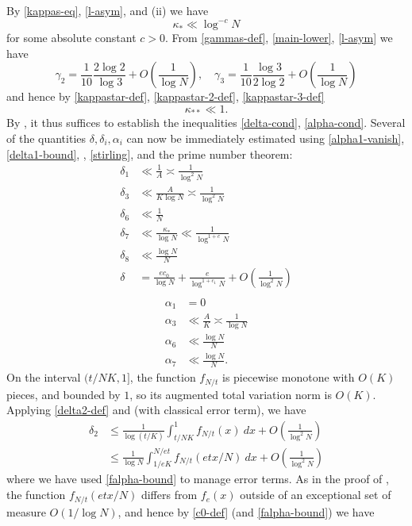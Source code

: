 \documentclass[12pt,a4paper,reqno]{amsart}
\numberwithin{equation}{section}
\theoremstyle{plain}
\theoremstyle{definition}
\begin{document}
By \eqref{kappas-eq}, \eqref{l-asym}, and (ii) we have
$$ \kappa_* \ll \log^{-c} N$$
for some absolute constant $c>0$.  From \eqref{gammas-def}, \eqref{main-lower}, \eqref{l-asym} we have
$$ \gamma_2 = \frac{1}{10} \frac{2\log 2}{\log 3} + O\left(\frac{1}{\log N}\right), \quad
 \gamma_3 = \frac{1}{10} \frac{\log 3}{2\log 2} + O\left(\frac{1}{\log N}\right)
$$
and hence by \eqref{kappastar-def},  \eqref{kappastar-2-def}, \eqref{kappastar-3-def}
$$ \kappa_{**} \ll 1.$$
By , it thus suffices to establish the inequalities \eqref{delta-cond}, \eqref{alpha-cond}.
Several of the quantities $\delta, \delta_i, \alpha_i$ can now be immediately estimated using \eqref{alpha1-vanish}, \eqref{delta1-bound}, , \eqref{stirling}, and the prime number theorem:
\begin{align*}
  \delta_1 &\ll \frac{1}{A} \asymp \frac{1}{\log^2 N} \\
  \delta_3 &\ll \frac{A}{K \log N} \asymp \frac{1}{\log^2 N} \\
  \delta_6 &\ll \frac{1}{N} \\
  \delta_7 &\ll \frac{\kappa_*}{\log N} \ll \frac{1}{\log^{1+c} N} \\
  \delta_8 &\ll \frac{\log N}{N} \\
  \delta &= \frac{ec_0}{\log N} + \frac{e}{\log^{1+c_1} N} + O\left( \frac{1}{\log^2 N} \right)\\  
\end{align*}
\begin{align*}
  \alpha_1 &= 0 \\
  \alpha_3 &\ll \frac{A}{K} \asymp \frac{1}{\log N} \\
  \alpha_6 &\ll \frac{\log N}{N} \\
  \alpha_7 &\ll \frac{\log N}{N}.
\end{align*}
On the interval $(t/NK,1]$, the function $f_{N/t}$ is piecewise monotone with $O(K)$ pieces, and bounded by $1$, so its augmented total variation norm is $O(K)$.  Applying \eqref{delta2-def} and  (with classical error term), we have
\begin{align*}
\delta_2 &\leq \frac{1}{\log(t/K)} \int_{t/NK}^1 f_{N/t}(x)\ dx + O\left( \frac{1}{\log^2 N} \right) \\
&\leq \frac{1}{\log N} \int_{1/eK}^{N/et} f_{N/t}(etx/N)\ dx + O\left( \frac{1}{\log^2 N} \right)
\end{align*}
where we have used \eqref{falpha-bound} to manage error terms.
As in the proof of , the function $f_{N/t}(etx/N)$ differs from $f_e(x)$ outside of an exceptional set of measure $O(1/\log N)$, and hence by \eqref{c0-def} (and \eqref{falpha-bound}) we have
\end{document}
